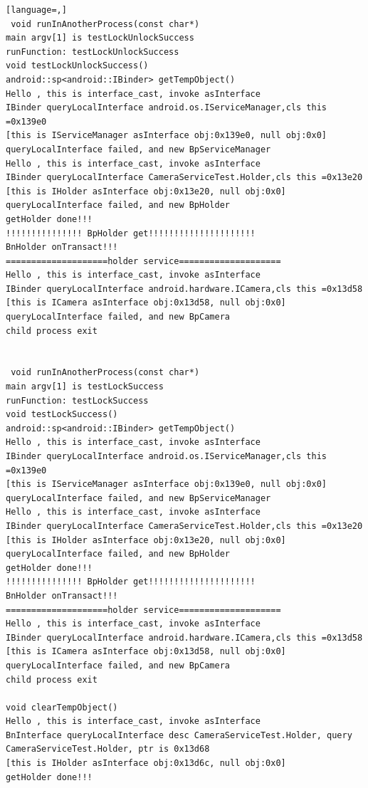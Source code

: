 \documentclass[a4paper,11pt]{article}
\begin{document}
\begin{appendices}
\begin{lstlisting}[language=,]
 void runInAnotherProcess(const char*)
main argv[1] is testLockUnlockSuccess
runFunction: testLockUnlockSuccess
void testLockUnlockSuccess()
android::sp<android::IBinder> getTempObject()
Hello , this is interface_cast, invoke asInterface
IBinder queryLocalInterface android.os.IServiceManager,cls this =0x139e0
[this is IServiceManager asInterface obj:0x139e0, null obj:0x0]
queryLocalInterface failed, and new BpServiceManager
Hello , this is interface_cast, invoke asInterface
IBinder queryLocalInterface CameraServiceTest.Holder,cls this =0x13e20
[this is IHolder asInterface obj:0x13e20, null obj:0x0]
queryLocalInterface failed, and new BpHolder
getHolder done!!!
!!!!!!!!!!!!!!! BpHolder get!!!!!!!!!!!!!!!!!!!!!
BnHolder onTransact!!!
====================holder service====================
Hello , this is interface_cast, invoke asInterface
IBinder queryLocalInterface android.hardware.ICamera,cls this =0x13d58
[this is ICamera asInterface obj:0x13d58, null obj:0x0]
queryLocalInterface failed, and new BpCamera
child process exit


 void runInAnotherProcess(const char*)
main argv[1] is testLockSuccess
runFunction: testLockSuccess
void testLockSuccess()
android::sp<android::IBinder> getTempObject()
Hello , this is interface_cast, invoke asInterface
IBinder queryLocalInterface android.os.IServiceManager,cls this =0x139e0
[this is IServiceManager asInterface obj:0x139e0, null obj:0x0]
queryLocalInterface failed, and new BpServiceManager
Hello , this is interface_cast, invoke asInterface
IBinder queryLocalInterface CameraServiceTest.Holder,cls this =0x13e20
[this is IHolder asInterface obj:0x13e20, null obj:0x0]
queryLocalInterface failed, and new BpHolder
getHolder done!!!
!!!!!!!!!!!!!!! BpHolder get!!!!!!!!!!!!!!!!!!!!!
BnHolder onTransact!!!
====================holder service====================
Hello , this is interface_cast, invoke asInterface
IBinder queryLocalInterface android.hardware.ICamera,cls this =0x13d58
[this is ICamera asInterface obj:0x13d58, null obj:0x0]
queryLocalInterface failed, and new BpCamera
child process exit

void clearTempObject()
Hello , this is interface_cast, invoke asInterface
BnInterface queryLocalInterface desc CameraServiceTest.Holder, query CameraServiceTest.Holder, ptr is 0x13d68
[this is IHolder asInterface obj:0x13d6c, null obj:0x0]
getHolder done!!!
\end{lstlisting}
\fi

\end{appendices}
\end{document}
